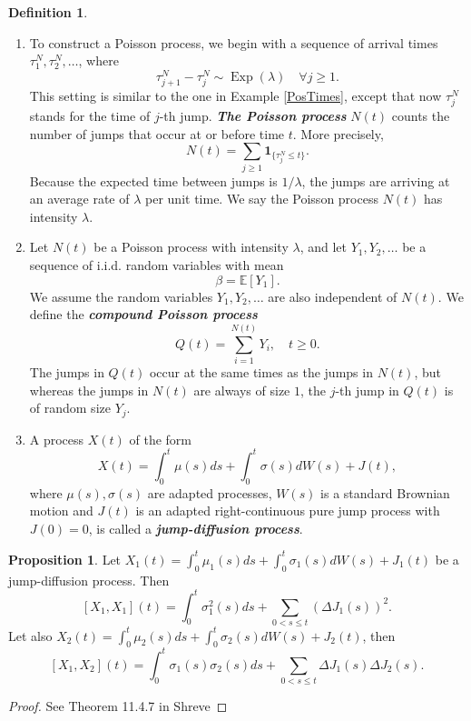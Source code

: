 \documentclass[a4paper,11pt]{article}
\theoremstyle{plain}
\theoremstyle{definition}
\newtheorem{defn}[thm]{Definition}
\newtheorem{prps}[thm]{Proposition}
\newcommand{\ME}{\mathbb{E}}
\newcommand{\define}[1]{\textit{\textbf{#1}}}
\begin{document}
    \begin{defn} \
    	\begin{enumerate}
    		\item To construct a Poisson process, we begin with a sequence of arrival times $\tau_1^N, \tau_2^N, \dots$, where
    		\[ \tau_{j+1}^N - \tau_j^N \sim \operatorname{Exp}(\lambda) \quad \forall j \geq 1.  \]
    		This setting is similar to the one in Example \ref{PosTimes}, except that now $\tau_j^N$ stands for the time of $j$-th jump. \define{The Poisson process} $N(t)$ counts the number of jumps that occur at or before time $t$. More precisely,
    		\[ N(t) = \sum_{j \geq 1} \mathbf{1}_{ \{\tau_j^N \leq t\}}. \]
    		Because the expected time between jumps is $1/\lambda$, the jumps are arriving at an average rate of $\lambda$ per unit time. We say the Poisson process $N(t)$ has intensity $\lambda$.
    		\item Let $N(t)$ be a Poisson process with intensity $\lambda$, and let $Y_1, Y_2, \dots$ be a sequence of i.i.d. random variables with mean
    		\[ \beta = \ME[Y_1]. \]
    		We assume the random variables $Y_1, Y_2, \dots$ are also independent of $N(t)$. We define the \define{compound Poisson process}
    		\[ Q(t) = \sum_{i=1}^{N(t)} Y_i, \quad t \geq 0. \]
    		The jumps in $Q(t)$ occur at the same times as the jumps in $N(t)$, but whereas the jumps in $N(t)$ are always of size $1$, the $j$-th jump in $Q(t)$ is of random size $Y_j$.
    		\item A process $X(t)$ of the form
    		\[ X(t) = \int_{0}^t \mu(s)ds + \int_{0}^{t} \sigma(s) dW(s) + J(t), \]
    		where $\mu(s), \sigma(s)$ are adapted processes, $W(s)$ is a standard Brownian motion and $J(t)$ is an adapted right-continuous pure jump process with $J(0) = 0$, is called a \define{jump-diffusion process}.
    	\end{enumerate}
    \end{defn}
    
    \begin{prps}
    	Let $X_1(t) = \int_{0}^t \mu_1(s)ds + \int_{0}^{t} \sigma_1(s) dW(s) + J_1(t)$ be a jump-diffusion process. Then
    	\[ [X_1, X_1](t) = \int_0^t \sigma_1^2(s)ds + \sum_{0 < s \leq t} (\Delta J_1(s) )^2. \]
    	Let also $X_2(t) = \int_{0}^t \mu_2(s)ds + \int_{0}^{t} \sigma_2(s) dW(s) + J_2(t)$, then
    	\[ [X_1, X_2](t) = \int_0^t \sigma_1(s) \sigma_2(s) ds + \sum_{0 < s \leq t} \Delta J_1(s)\Delta J_2(s). \]
    \end{prps}
    \begin{proof}
    	See Theorem 11.4.7 in Shreve
    \end{proof}
    
\end{document}
